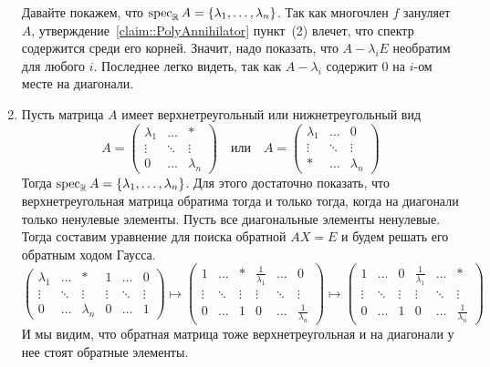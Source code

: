 \begin{enumerate}
Давайте покажем, что $\operatorname{spec}_\mathbb R A = \{\lambda_1,\ldots, \lambda_n\}$.
Так как многочлен $f$ зануляет $A$, утверждение~\ref{claim::PolyAnnihilator} пункт~(2) влечет, что спектр содержится среди его корней.
Значит, надо показать, что $A-\lambda_i E$ необратим для любого $i$.
Последнее легко видеть, так как $A-\lambda_i$ содержит $0$ на $i$-ом месте на диагонали.

\item  Пусть матрица $A$ имеет верхнетреугольный или нижнетреугольный вид
\[
A = 
\begin{pmatrix}
{\lambda_1}&{\ldots}&{*}\\
{\vdots}&{\ddots}&{\vdots}\\
{0}&{\ldots}&{\lambda_n}
\end{pmatrix}
\quad
\text{или}
\quad
A = 
\begin{pmatrix}
{\lambda_1}&{\ldots}&{0}\\
{\vdots}&{\ddots}&{\vdots}\\
{*}&{\ldots}&{\lambda_n}
\end{pmatrix}
\]
Тогда $\operatorname{spec}_\mathbb RA = \{\lambda_1,\ldots, \lambda_n\}$.
Для этого достаточно показать, что верхнетреугольная матрица обратима тогда и только тогда, когда на диагонали только ненулевые элементы.
Пусть все диагональные элементы ненулевые.
Тогда составим уравнение для поиска обратной $AX = E$ и будем решать его обратным ходом Гаусса.
\[
\left(
\begin{array}{ccc|ccc}
{\lambda_1}&{\ldots}&{*}&{1}&{\ldots}&{0}\\
{\vdots}&{\ddots}&{\vdots}&{\vdots}&{\ddots}&{\vdots}\\
{0}&{\ldots}&{\lambda_n}&{0}&{\ldots}&{1}
\end{array}
\right)
\mapsto
\left(
\begin{array}{ccc|ccc}
{1}&{\ldots}&{*}&{\frac{1}{\lambda_1}}&{\ldots}&{0}\\
{\vdots}&{\ddots}&{\vdots}&{\vdots}&{\ddots}&{\vdots}\\
{0}&{\ldots}&{1}&{0}&{\ldots}&{\frac{1}{\lambda_n}}
\end{array}
\right)
\mapsto
\left(
\begin{array}{ccc|ccc}
{1}&{\ldots}&{0}&{\frac{1}{\lambda_1}}&{\ldots}&{*}\\
{\vdots}&{\ddots}&{\vdots}&{\vdots}&{\ddots}&{\vdots}\\
{0}&{\ldots}&{1}&{0}&{\ldots}&{\frac{1}{\lambda_n}}
\end{array}
\right)
\]
И мы видим, что обратная матрица тоже верхнетреугольная и на диагонали у нее стоят обратные элементы.


\end{enumerate}
